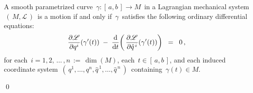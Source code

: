 \vskip 0.5cm
\begin{proposition}
\label{EulerLagrangeEquations}
\mbox{}
\vskip 0.1cm
\noindent
A smooth parametrized curve
\,$\gamma : [\,a,b\,] \longrightarrow M$\,
in a Lagrangian mechanical system
\,$\left(\,M,\mathscr{L}\,\right)$\,
is a motion if and only if
\,$\gamma$\,
satisfies the following ordinary differential equations:
\begin{equation*}
\dfrac{\partial\mathscr{L}}{\partial q^{i}}\!\left(\gamma^{\prime}(t)\right)
\; - \;
\dfrac{\textnormal{d}}{\textnormal{d} t}\!\left(\,\dfrac{\partial\mathscr{L}}{\partial \hat{q}^{\,i}}\!\left(\gamma^{\prime}(t)\right)\right)
\;\; = \;\;
0\,,
\end{equation*}
for each \,$i = 1, 2, \,\ldots\, , n \,:=\, \dim(M)$,
each \,$t \in [\,a,b\,]$, and
each induced coordinate system \,$\left(\,q^{1},\ldots,q^{n},\hat{q}^{\,1},\ldots,\hat{q}^{\,n}\,\right)$\,
containing \,$\gamma(t) \in M$.
\end{proposition}
\proof

\qed




